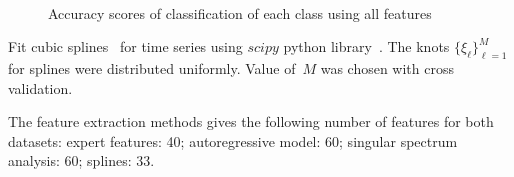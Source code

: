\begin{figure}[!h]
	\\
	\caption{Accuracy scores of classification of each class using all features}
	\label{fig::feature_union_results}
\end{figure}

Fit cubic splines~\cite{deboor1978splines} for time series using $scipy$ python library~\cite{scipy}. 
The knots $\{\xi_{\ell}\}_{\ell = 1}^M$ for splines were distributed uniformly. 
Value of~$M$ was chosen with cross validation. 

The feature extraction methods gives the following number of features for both datasets: expert features: 40; autoregressive model: 60; singular spectrum analysis: 60; splines: 33.

